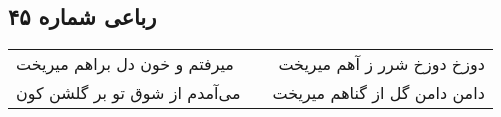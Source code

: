 \begin{center}
\section*{رباعی شماره ۴۵}
\label{sec:sh045}
\begin{longtable}{l p{0.5cm} r}
میرفتم و خون دل براهم میریخت
&&
دوزخ دوزخ شرر ز آهم میریخت
\\
می‌آمدم از شوق تو بر گلشن کون
&&
دامن دامن گل از گناهم میریخت
\\
\end{longtable}
\end{center}
